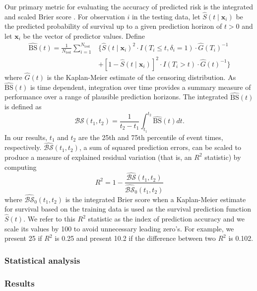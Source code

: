 \documentclass[twoside,11pt]{article}\usepackage[]{graphicx}\usepackage[]{xcolor}
\newcommand{\ie}{that is}
\newcommand{\bstat}{\widehat{\text{BS}}(t)}
\newcommand{\bsbar}{\mathcal{\widehat{BS}}(t_1, t_2)}
\newcommand{\bskap}{\mathcal{\widehat{BS}}_0(t_1, t_2)}
\newcommand{\ntest}{N_{\text{test}}}
\begin{document}
Our primary metric for evaluating the accuracy of predicted risk is the integrated and scaled Brier score \citep{graf1999assessment}. For observation $i$ in the testing data, let $\widehat{S}(t \mid \bm{x}_i)$ be the predicted probability of survival up to a given prediction horizon of $t > 0$ and let $\bm{x}_i$ be the vector of predictor values. Define \begin{align*}
\bstat = \frac{1}{\ntest} \sum_{i=1}^{\ntest} &\{ \widehat{S}(t \mid \bm{x}_i)^2 \cdot I(T_i \leq t, \delta_i = 1) \cdot \widehat{G}(T_i)^{-1} \\ &+ [1-\widehat{S}(t \mid \bm{x}_i)]^2 \cdot I(T_i > t) \cdot \widehat{G}(t)^{-1}\}
\end{align*} where $\widehat{G}(t)$ is the Kaplan-Meier estimate of the censoring distribution. As $\bstat$ is time dependent, integration over time provides a summary measure of performance over a range of plausible prediction horizons. The integrated $\bstat$ is defined as \begin{equation}
\bsbar = \frac{1}{t_2 - t_1}\int_{t_1}^{t_2} \widehat{\text{BS}}(t) dt.
\end{equation} In our results, $t_1$ and $t_2$ are the 25th and 75th percentile of event times, respectively. $\bsbar$, a sum of squared prediction errors, can be scaled to produce a measure of explained residual variation (\ie, an $R^2$ statistic) by computing \begin{equation}
R^2 = 1 - \frac{\bsbar}{\bskap}
\end{equation} where $\bskap$ is the integrated Brier score when a Kaplan-Meier estimate for survival based on the training data is used as the survival prediction function $\widehat{S}(t)$. We refer to this $R^2$ statistic as the index of prediction accuracy and we scale its values by 100 to avoid unnecessary leading zero's. For example, we present 25 if $R^2$ is 0.25 and present 10.2 if the difference between two $R^2$ is 0.102.

\subsubsection{Statistical analysis}

\subsubsection{Results}
\end{document}
